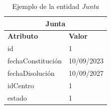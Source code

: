 \begin{itemize}
    \begin{table}[H]
    \centering
        \begin{tabular}{ |p{6cm}||p{6cm}|  }
             \hline
                \multicolumn{2}{|c|}{\textbf{Junta}} \\
             \hline
                 \textbf{Atributo} & \textbf{Valor} \\
             \hline
                 id & 1 \\
             \hline
                 fechaConstitución & 10/09/2023 \\
             \hline
                 fechaDisolución & 10/09/2027 \\
             \hline
                 idCentro & 1 \\
             \hline
                 estado & 1 \\
        \end{tabular}
        \caption{Ejemplo de la entidad \textit{Junta}}
        \label{table:T-Junta}
    \end{table}
\end{itemize}

